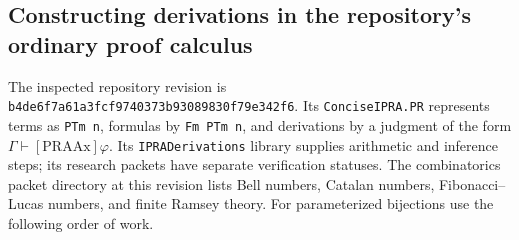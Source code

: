 \subsection{Constructing derivations in the repository's ordinary proof calculus}
The inspected repository revision is \texttt{b4de6f7a61a3fcf9740373b93089830f79e342f6}. Its \texttt{ConciseIPRA.PR} represents terms as \texttt{PTm n}, formulas by \texttt{Fm PTm n}, and derivations by a judgment of the form \(\Gamma\vdash[\mathrm{PRAAx}]\varphi\). Its \texttt{IPRADerivations} library supplies arithmetic and inference steps; its research packets have separate verification statuses. The combinatorics packet directory at this revision lists Bell numbers, Catalan numbers, Fibonacci--Lucas numbers, and finite Ramsey theory. For parameterized bijections use the following order of work.

